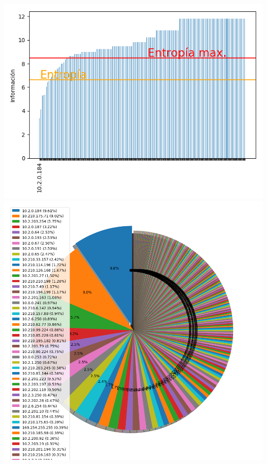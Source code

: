 \hspace*{-1.5cm}
 \includegraphics[scale=0.6]{../plots/labos_s2_informacion.png}
 \includegraphics[scale=0.4]{../plots/labos_s2_probabilidades.png}

